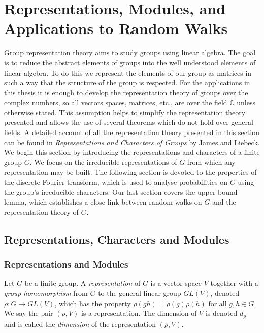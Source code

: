 \documentclass[11pt]{report}
\begin{document}
\section{Representations, Modules, and Applications to Random Walks}
\label{chpt3:chpt}

Group representation theory aims to  study groups using linear algebra. The goal is to reduce the abstract elements of groups into the well understood elements of linear algebra. To do this we represent the elements of our group as matrices in such a way that the structure of the group is respected. For the applications in this thesis it is enough to develop the representation theory of groups over the complex numbers, so all vectors spaces, matrices, etc., are over the field $\mathbb{C}$ unless otherwise stated. 
This assumption helps to simplify the 
representation theory presented and allows the use of several theorems which do not hold over general fields. A detailed account of all the representation theory presented in this section can be found in \emph{Representations and Characters of Groups} by James and Liebeck\cite{james2001representations}. We begin this section by introducing the representations and characters of a finite group $G$.  We focus on the irreducible representations of $G$ from which any representation may be built. The following section is devoted to the properties of the discrete Fourier transform, which is used to analyse probabilities on $G$ using the group's irreducible characters. Our last section covers the upper bound lemma, which establishes a close link between random walks on $G$ and the representation theory of $G$. 


\subsection{Representations, Characters and Modules}

\subsubsection{Representations and Modules}


\begin{defn}
	Let $G$ be a finite group. A \emph{representation} of $G$ is a vector space $V$ 
	together with a \emph{group homomorphism} from $G$ to the general linear group $GL(V)$, denoted $\rho:G \to GL(V)$,
	which has the property 
	$\rho(gh) = \rho(g)\rho(h)$ for all $g,h \in G$. We say the pair $(\rho,V)$ is a representation. The dimension of $V$ is denoted $d_{\rho}$ and is called 
	the \emph{dimension} of the representation $(\rho,V)$.
\end{defn}
\end{document}
